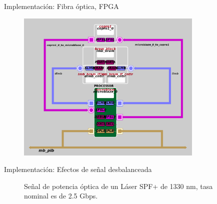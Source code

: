 \documentclass[aspectratio=169]{beamer}
\begin{document}
\begin{frame}{Implementación: Fibra óptica, FPGA}

\begin{figure}[t]
  \centering
    \includegraphics[width=3.5in]{../graphs/diagramaXilinx.png}
\label{fig:fpgahard}
\end{figure}

\end{frame}



\begin{frame}{Implementación: Efectos de señal desbalanceada}


\begin{figure}[!t]
   \centering
   \qquad
   \qquad
   
  \vspace{0.2cm}
  Señal de potencia óptica de un Láser SPF+ de 1330 nm, tasa nominal es de 2.5 Gbps.
  \label{fig:ImgExpansion}
\end{figure}
\end{frame}
\end{document}
